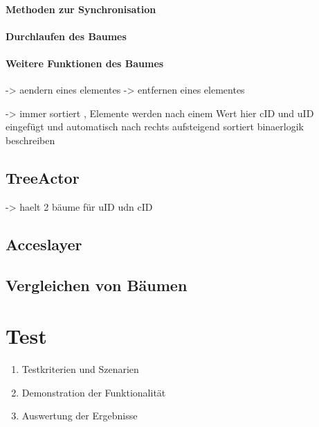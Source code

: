 \documentclass[a4paper,11pt,oneside,%
headsepline,												%
footsepline,												%
bibtotocnumbered									%
]{scrreprt}
\begin{document}
\subsubsection{Methoden zur Synchronisation}

\subsubsection{Durchlaufen des Baumes}

\subsubsection{Weitere Funktionen des Baumes}
-> aendern eines elementes 
-> entfernen eines elementes


-> immer sortiert , Elemente werden nach einem Wert hier cID und uID eingefügt und automatisch nach rechts aufsteigend sortiert
binaerlogik beschreiben




	\section{TreeActor}
-> haelt 2 bäume für uID udn cID

\section{Acceslayer}

\section{Vergleichen von Bäumen}

\chapter{Test}
		\begin{enumerate}[1.]
			\item Testkriterien und Szenarien
			\item Demonstration der Funktionalität
			\item Auswertung der Ergebnisse
		\end{enumerate}
\end{document}
